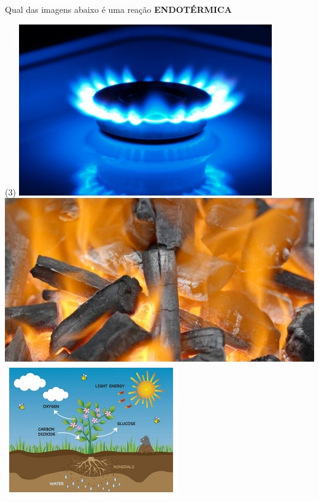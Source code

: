 \documentclass[11pt]{article}
\begin{document}
\begin{exercise}
Qual das imagens abaixo é uma reação \textbf{ENDOTÉRMICA}

\begin{choice}(3)
\choice \includegraphics[scale=.3]{Adaptadas/gas.png}
\choice \includegraphics[scale=.3]{Adaptadas/carvao.png}
\choice \includegraphics[scale=.5]{Adaptadas/fotosintesse.png}
\end{choice}
\end{exercise}




\end{document}
